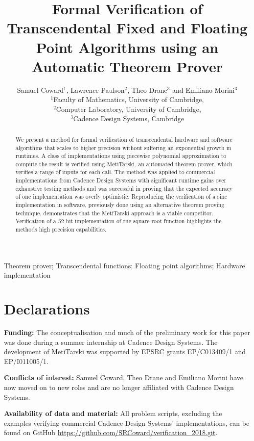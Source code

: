 \documentclass{fac}
\title[Transcendental Verification using Theorem Proving]{Formal Verification of Transcendental Fixed and Floating Point Algorithms using an Automatic Theorem Prover}
\author[Samuel Coward]
    {Samuel Coward$^1$, Lawrence Paulson$^2$, Theo Drane$^3$ and Emiliano Morini$^3$\\
     $^1$Faculty of Mathematics, University of Cambridge,\\
     $^2$Computer Laboratory, University of Cambridge,\\
     $^3$Cadence Design Systems, Cambridge\\}
\begin{document}
\label{firstpage}

\makecorrespond

\maketitle

\begin{abstract}
We present a method for formal verification of transcendental hardware and software algorithms that scales to higher precision without suffering an exponential growth in runtimes. A class of implementations using piecewise polynomial approximation to compute the result is verified using MetiTarski, an automated theorem prover, which verifies a range of inputs for each call. The method was applied to commercial implementations from Cadence Design Systems with significant runtime gains over exhaustive testing methods and was successful in proving that the expected accuracy of one implementation was overly optimistic. Reproducing the verification of a sine implementation in software, previously done using an alternative theorem proving technique, demonstrates that the MetiTarski approach is a viable competitor. Verification of a 52 bit implementation of the square root function highlights the methods high precision capabilities.  
\end{abstract}
\begin{keywords}Theorem prover; Transcendental functions; Floating point algorithms; Hardware implementation
\end{keywords}

\section*{Declarations}
\textbf{Funding:} The conceptualisation and much of the preliminary work for this paper was done during a summer internship at Cadence Design Systems.
The development of MetiTarski was supported by EPSRC grants EP/C013409/1 and EP/I011005/1.

\noindent\textbf{Conflicts of interest:} Samuel Coward, Theo Drane and Emiliano Morini have now moved on to new roles and are no longer affiliated with Cadence Design Systems. 

\noindent\textbf{Availability of data and material:} All problem scripts, excluding the examples verifying commercial Cadence Design Systems' implementations, can be found on GitHub \newline \url{https://github.com/SRCoward/verification\_2018.git}.
\end{document}
